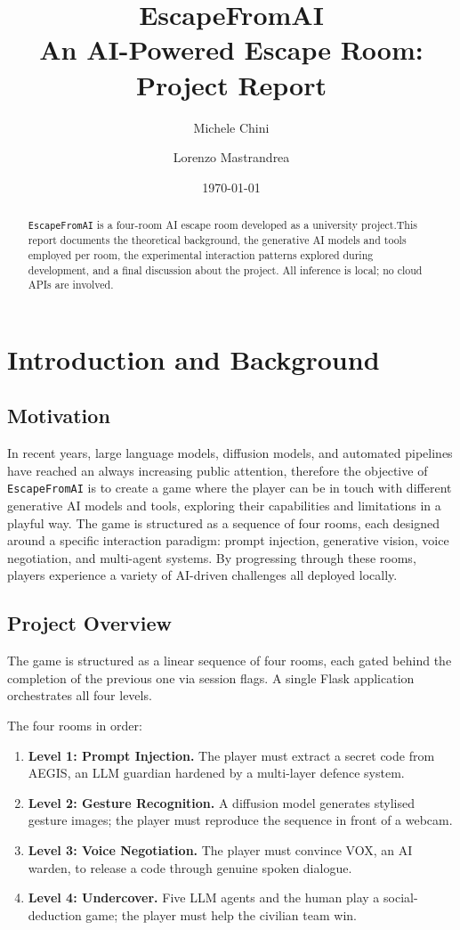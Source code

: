 \documentclass[11pt,a4paper]{article}
\title{\textbf{EscapeFromAI} \\[4pt]
\large An AI-Powered Escape Room: Project Report}
\author{Michele Chini \and Lorenzo Mastrandrea}
\date{\today}
\begin{document}
\maketitle

\begin{abstract}
\noindent \texttt{EscapeFromAI} is a four-room AI escape room developed as a university project.This report documents the theoretical background, the generative AI models and tools employed per room, the experimental interaction patterns explored during development, and a final discussion about the project.
All inference is local; no cloud APIs are involved.
\end{abstract}

\section{Introduction and Background}

\subsection{Motivation}

In recent years, large language models, diffusion models, and automated pipelines have reached an always increasing public attention, therefore the objective of \texttt{EscapeFromAI} is to create a game where the player can  be in touch with different generative AI models and tools, exploring their capabilities and limitations in a playful way. The game is structured as a sequence of four rooms, each designed around a specific interaction paradigm: prompt injection, generative vision, voice negotiation, and multi-agent systems. By progressing through these rooms, players experience a variety of AI-driven challenges all deployed locally.

\subsection{Project Overview}

The game is structured as a linear sequence of four rooms, each gated behind the
completion of the previous one via session flags. A single Flask application
orchestrates all four levels.

\noindent The four rooms in order:
\begin{enumerate}[leftmargin=*,itemsep=3pt]
    \item \textbf{Level 1: Prompt Injection.} The player must extract a secret code
    from AEGIS, an LLM guardian hardened by a multi-layer defence system.
    \item \textbf{Level 2: Gesture Recognition.} A diffusion model generates stylised
    gesture images; the player must reproduce the sequence in front of a webcam.
    \item \textbf{Level 3: Voice Negotiation.} The player must convince VOX, an AI
    warden, to release a code through genuine spoken dialogue.
    \item \textbf{Level 4: Undercover.} Five LLM agents and the human play a
    social-deduction game; the player must help the civilian team win.
\end{enumerate}
\end{document}
